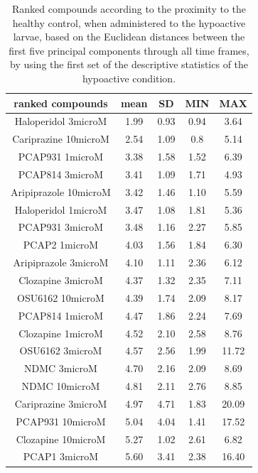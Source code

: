 \documentclass[a4paper,12pt]{article}
\begin{document}
\begin{table}[h!]\tiny
\centering
\caption{Ranked compounds according to the proximity to the healthy control, when administered to the hypoactive larvae, based on the Euclidean distances between the first five principal components through all time frames, by using the first set of the descriptive statistics of the hypoactive condition.}
\begin{tabular}{|c|c|c|c|c|}
\hline
ranked compounds             & mean & SD   & MIN  & MAX   \\ \hline
Haloperidol 3microM   & 1.99  & 0.93  & 0.94 & 3.64  \\ \hline
Cariprazine 10microM  & 2.54  & 1.09  & 0.8  & 5.14  \\ \hline
PCAP931 1microM       & 3.38  & 1.58  & 1.52 & 6.39  \\ \hline
PCAP814 3microM       & 3.41  & 1.09  & 1.71 & 4.93  \\ \hline
Aripiprazole 10microM & 3.42  & 1.46  & 1.10  & 5.59  \\ \hline
Haloperidol 1microM   & 3.47  & 1.08  & 1.81 & 5.36  \\ \hline
PCAP931 3microM       & 3.48  & 1.16  & 2.27 & 5.85  \\ \hline
PCAP2 1microM         & 4.03  & 1.56  & 1.84 & 6.30   \\ \hline
Aripiprazole 3microM  & 4.10   & 1.11  & 2.36 & 6.12  \\ \hline
Clozapine 3microM     & 4.37  & 1.32  & 2.35 & 7.11  \\ \hline
OSU6162 10microM      & 4.39  & 1.74  & 2.09 & 8.17  \\ \hline
PCAP814 1microM       & 4.47  & 1.86  & 2.24 & 7.69  \\ \hline
Clozapine 1microM     & 4.52  & 2.10   & 2.58 & 8.76  \\ \hline
OSU6162 3microM       & 4.57  & 2.56  & 1.99 & 11.72 \\ \hline
NDMC 3microM          & 4.70   & 2.16  & 2.09 & 8.69  \\ \hline
NDMC 10microM         & 4.81  & 2.11  & 2.76 & 8.85  \\ \hline
Cariprazine 3microM   & 4.97  & 4.71  & 1.83 & 20.09 \\ \hline
PCAP931 10microM      & 5.04  & 4.04  & 1.41 & 17.52 \\ \hline
Clozapine 10microM    & 5.27  & 1.02  & 2.61 & 6.82  \\ \hline
PCAP1 3microM         & 5.60   & 3.41  & 2.38 & 16.40  \\ \hline

\end{tabular}
\end{table}
\end{document}
